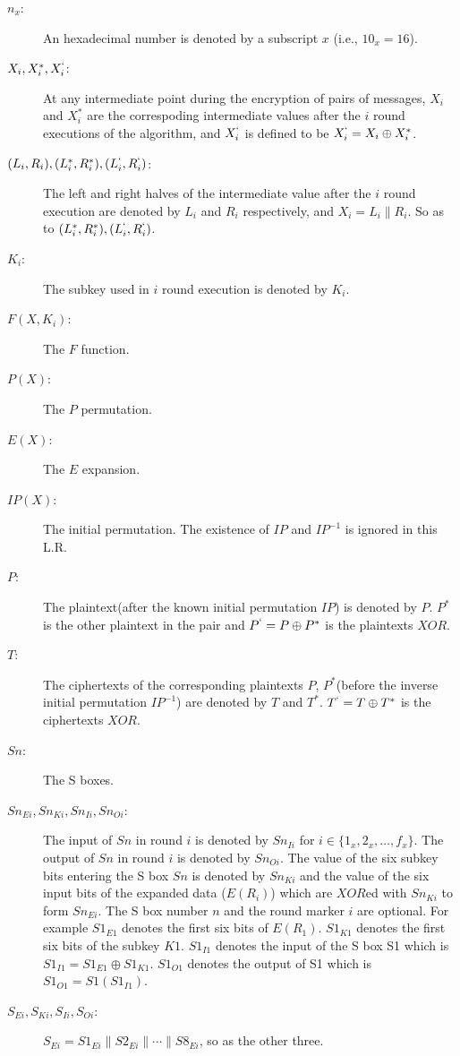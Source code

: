 \documentclass[a4paper,10pt]{article}
\begin{document}
\begin{description}
 \item[$n_x$:] An hexadecimal number is denoted by a subscript $x$ (i.e., $10_x=16$).

 \item[$X_i, X_i^*, X_i^`$:] At any intermediate point during the encryption of pairs of messages, $X_i$ and $X_i^*$ are the correspoding intermediate values after the $i$ round executions of the algorithm, and $X_i^`$ is defined to be $X_i^`=X_i \oplus X_i^*$.

 \item[$(L_i,R_i), (L_i^*,R_i^*), (L_i^`,R_i^`)$:] The left and right halves of the intermediate value after the $i$ round execution are denoted by $L_i$ and $R_i$ respectively, and $X_i=L_i \parallel R_i$. So as to $(L_i^*,R_i^*), (L_i^`,R_i^`)$.

 \item[$K_i$:] The subkey used in $i$ round execution is denoted by $K_i$.

 \item[$F(X,K_i)$:] The $F$ function.

 \item[$P(X)$:] The $P$ permutation.

 \item[$E(X)$:] The $E$ expansion.

 \item[$IP(X)$:] The initial permutation. The existence of $IP$ and $IP^{-1}$ is ignored in this L.R.

 \item[$P$:] The plaintext(after the known initial permutation $IP$) is denoted by $P$. $P^*$ is the other plaintext in the pair and $P^`=P \oplus P^*$ is the plaintexts $XOR$.

 \item[$T$:] The ciphertexts of the corresponding plaintexts $P$, $P^*$(before the inverse initial permutation $IP^{-1}$) are denoted by $T$ and $T^*$. $T^`=T \oplus T^*$ is the ciphertexts $XOR$.

 \item[$Sn$:] The S boxes.

 \item[$Sn_{Ei}, Sn_{Ki}, Sn_{Ii}, Sn_{Oi}$:] The input of $Sn$ in round $i$ is denoted by $Sn_{Ii}$ for $i\in\{1_x, 2_x, \ldots, f_x\}$. The output of $Sn$ in round $i$ is denoted by $Sn_{Oi}$. The value of the six subkey bits entering the S box $Sn$ is denoted by $Sn_{Ki}$ and the value of the six input bits of the expanded data ($E(R_i)$) which are $XOR$ed with $Sn_{Ki}$ to form $Sn_{Ei}$. The S box number $n$ and the round marker $i$ are optional. For example $S1_{E1}$ denotes the first six bits of $E(R_1)$. $S1_{K1}$ denotes the first six bits of the subkey $K1$. $S1_{I1}$ denotes the input of the S box S1 which is $S1_{I1}=S1_{E1} \oplus S1_{K1}$. $S1_{O1}$ denotes the output of S1 which is $S1_{O1}=S1(S1_{I1})$.

 \item[$S_{Ei}, S_{Ki}, S_{Ii}, S_{Oi}$:] $S_{Ei} = S1_{Ei} \parallel S2_{Ei} \parallel \cdots \parallel S8_{Ei}$, so as the other three.

\end{description}
\end{document}
